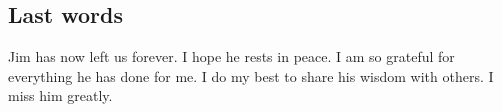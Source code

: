 \documentclass[CJK,11pt]{amsart}
\theoremstyle{definition}
\begin{document}
\begin{CJK*}{UTF8}{gbsn}
\section{Last words}
Jim has now left us forever. I hope he rests in peace. I am so grateful for everything he has done for me. I do my best to share his wisdom with others. I miss him greatly. 


\end{CJK*}
\end{document}
